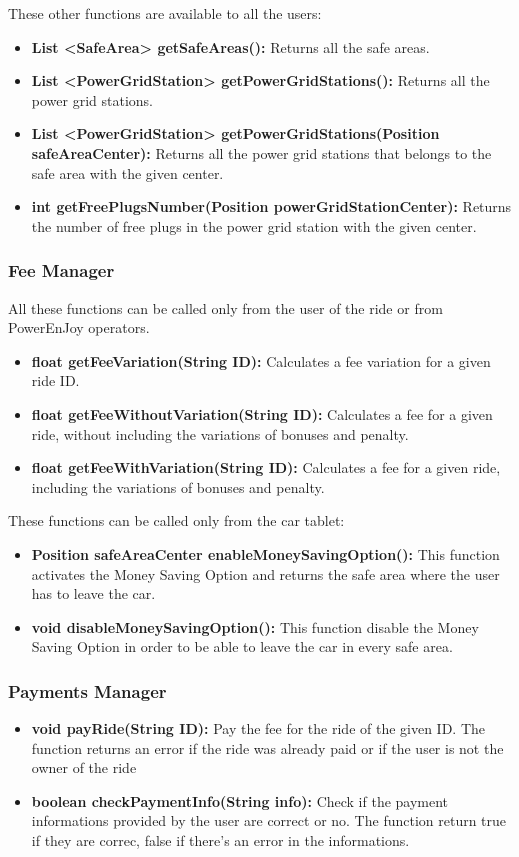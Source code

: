 These other functions are available to all the users:
\begin{itemize}
	\item \textbf{List \textless SafeArea\textgreater{} getSafeAreas():} Returns all the safe areas.
	\item \textbf{List \textless PowerGridStation\textgreater{} getPowerGridStations():} Returns all the power grid stations.
	\item \textbf{List \textless PowerGridStation\textgreater{} getPowerGridStations(Position safeAreaCenter):} Returns all the power grid stations that belongs to the safe area with the given center.
	\item \textbf{int getFreePlugsNumber(Position powerGridStationCenter):} Returns the number of free plugs in the power grid station with the given center.
\end{itemize}

\subsubsection{Fee Manager}
All these functions can be called only from the user of the ride or from PowerEnJoy operators.
\begin{itemize}
	\item \textbf{float getFeeVariation(String ID):} Calculates a fee variation for a given ride ID. 
	\item \textbf{float getFeeWithoutVariation(String ID):} Calculates a fee for a given ride, without including the variations of bonuses and penalty.
	\item \textbf{float getFeeWithVariation(String ID):} Calculates a fee for a given ride, including the variations of bonuses and penalty.
\end{itemize}

These functions can be called only from the car tablet:
\begin{itemize}
	\item \textbf{Position safeAreaCenter enableMoneySavingOption():} This function activates the Money Saving Option and returns the safe area where the user has to leave the car.
	\item \textbf{void disableMoneySavingOption():} This function disable the Money Saving Option in order to be able to leave the car in every safe area.
\end{itemize}

\subsubsection{Payments Manager}
\begin{itemize}
	\item \textbf{void payRide(String ID):} Pay the fee for the ride of the given ID. The function returns an error if the ride was already paid or if the user is not the owner of the ride
	\item \textbf{boolean checkPaymentInfo(String info):} Check if the payment informations provided by the user are correct or no. The function return true if they are correc, false if there's an error in the informations.
\end{itemize}




